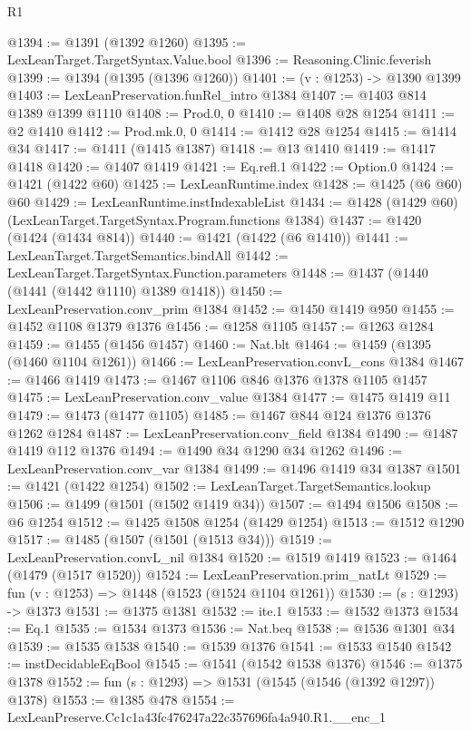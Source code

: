 \begin{lexlean}{R1}
\begin{coremodule}
@1394 := @1391 (@1392 @1260)
@1395 := LexLeanTarget.TargetSyntax.Value.bool
@1396 := Reasoning.Clinic.feverish
@1399 := @1394 (@1395 (@1396 @1260))
@1401 := (v : @1253) -> @1390 @1399
@1403 := LexLeanPreservation.funRel_intro @1384
@1407 := @1403 @814 @1389 @1399 @1110
@1408 := Prod.{0, 0}
@1410 := @1408 @28 @1254
@1411 := @2 @1410
@1412 := Prod.mk.{0, 0}
@1414 := @1412 @28 @1254
@1415 := @1414 @34
@1417 := @1411 (@1415 @1387)
@1418 := @13 @1410
@1419 := @1417 @1418
@1420 := @1407 @1419
@1421 := Eq.refl.{1}
@1422 := Option.{0}
@1424 := @1421 (@1422 @60)
@1425 := LexLeanRuntime.index
@1428 := @1425 (@6 @60) @60
@1429 := LexLeanRuntime.instIndexableList
@1434 := @1428 (@1429 @60) (LexLeanTarget.TargetSyntax.Program.functions @1384)
@1437 := @1420 (@1424 (@1434 @814))
@1440 := @1421 (@1422 (@6 @1410))
@1441 := LexLeanTarget.TargetSemantics.bindAll
@1442 := LexLeanTarget.TargetSyntax.Function.parameters
@1448 := @1437 (@1440 (@1441 (@1442 @1110) @1389 @1418))
@1450 := LexLeanPreservation.conv_prim @1384
@1452 := @1450 @1419 @950
@1455 := @1452 @1108 @1379 @1376
@1456 := @1258 @1105
@1457 := @1263 @1284
@1459 := @1455 (@1456 @1457)
@1460 := Nat.blt
@1464 := @1459 (@1395 (@1460 @1104 @1261))
@1466 := LexLeanPreservation.convL_cons @1384
@1467 := @1466 @1419
@1473 := @1467 @1106 @846 @1376 @1378 @1105 @1457
@1475 := LexLeanPreservation.conv_value @1384
@1477 := @1475 @1419 @11
@1479 := @1473 (@1477 @1105)
@1485 := @1467 @844 @124 @1376 @1376 @1262 @1284
@1487 := LexLeanPreservation.conv_field @1384
@1490 := @1487 @1419 @112 @1376
@1494 := @1490 @34 @1290 @34 @1262
@1496 := LexLeanPreservation.conv_var @1384
@1499 := @1496 @1419 @34 @1387
@1501 := @1421 (@1422 @1254)
@1502 := LexLeanTarget.TargetSemantics.lookup
@1506 := @1499 (@1501 (@1502 @1419 @34))
@1507 := @1494 @1506
@1508 := @6 @1254
@1512 := @1425 @1508 @1254 (@1429 @1254)
@1513 := @1512 @1290
@1517 := @1485 (@1507 (@1501 (@1513 @34)))
@1519 := LexLeanPreservation.convL_nil @1384
@1520 := @1519 @1419
@1523 := @1464 (@1479 (@1517 @1520))
@1524 := LexLeanPreservation.prim_natLt
@1529 := fun (v : @1253) => @1448 (@1523 (@1524 @1104 @1261))
@1530 := (s : @1293) -> @1373
@1531 := @1375 @1381
@1532 := ite.{1}
@1533 := @1532 @1373
@1534 := Eq.{1}
@1535 := @1534 @1373
@1536 := Nat.beq
@1538 := @1536 @1301 @34
@1539 := @1535 @1538
@1540 := @1539 @1376
@1541 := @1533 @1540
@1542 := instDecidableEqBool
@1545 := @1541 (@1542 @1538 @1376)
@1546 := @1375 @1378
@1552 := fun (s : @1293) => @1531 (@1545 (@1546 (@1392 @1297)) @1378)
@1553 := @1385 @478
@1554 := LexLeanPreserve.Cc1c1a43fc476247a22c357696fa4a940.R1.__enc_1

\end{coremodule}
\end{lexlean}
